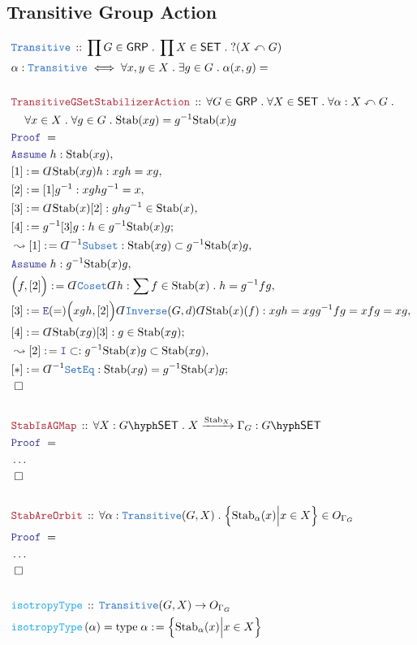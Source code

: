 \documentclass[12pt]{scrartcl}
\newcommand{\TYPE}[1]{\textcolor{NavyBlue}{\mathtt{#1}}}
\newcommand{\FUNC}[1]{\textcolor{Cerulean}{\mathtt{#1}}}
\newcommand{\LOGIC}[1]{\textcolor{Blue}{\mathtt{#1}}}
\newcommand{\THM}[1]{\textcolor{Maroon}{\mathtt{#1}}}
\renewcommand{\.}{\; . \;}
\newcommand{\de}{: \kern 0.1pc =}
\newcommand{\Act}[1]{\left( #1 \right)}
\newcommand{\Theorem}[2]{& \THM{#1} \, :: \, #2 \\ & \Proof = \\ }
\newcommand{\DeclareType}[2]{& \TYPE{#1} \, :: \, #2 \\}
\newcommand{\DefineType}[3]{& #1 : \TYPE{#2} \iff #3 \\}
\newcommand{\DeclareFunc}[2]{& \FUNC{#1} \, :: \, #2 \\}
\newcommand{\DefineNamedFunc}[4]{&  \FUNC{#1}\Act{#2} = #3 \de #4 \\}
\newcommand{\NewLine}{\\ & \kern 1pc}
\newcommand{\Page}[1]{ \begin{align*} #1 \end{align*}   }
\newcommand{ \bd }{ \ByDef }
\newcommand{\NoProof}{ & \ldots \\ \EndProof}
\newcommand{\Intro}{\LOGIC{I}}
\newcommand{\Elim}{\LOGIC{E}}
\newcommand{\Arrow}{\xrightarrow}
\newcommand{\Say}[3]{& #1 \de #2 : #3, \\}
\newcommand{\Conclude}[3]{& #1 \de #2 : #3; \\}
\newcommand{\Derive}[3]{& \leadsto #1 \de #2 : #3, \\}
\newcommand{\Assume}[2]{& \LOGIC{Assume} \; #1 : #2, \\}
\newcommand{\QED}{\; \square}
\newcommand{\EndProof}{& \QED \\}
\newcommand{\ByDef}{\rotatebox[origin=c]{-180}{$D$}}%
\newcommand{\Proof}{\LOGIC{Proof} \; }
\newcommand{\SET}{\mathsf{SET}}
\newcommand{\Stab}{\mathrm{Stab}}
\newcommand{\action}{\curvearrowleft}
\newcommand{\GRP}{\mathsf{GRP}}
\begin{document}
\subsection{Transitive Group Action}
\Page{
	\DeclareType{Transitive}{
		\prod G \in \GRP \. 
		\prod X \in \SET \.
		?(X \action G)
	}
	\DefineType{\alpha}{Transitive}{\forall x,y \in X \. \exists g \in G \. \alpha(x,g) = }
	\\
	\Theorem{TransitiveGSetStabilizerAction}
	{
		\forall G \in \GRP \.
		\forall X \in \SET \.
		\forall \alpha : X \action G \. \NewLine
		\forall x \in X \. 
		\forall g \in G \. 
		\Stab(xg) = g^{-1}\Stab(x)g 
	}
	\Assume{h}{\Stab(xg)}
	\Say{[1]}{\bd \Stab(xg) h}{xgh = xg}
	\Say{[2]}{[1]g^{-1}}{xghg^{-1} = x}
	\Say{[3]}{\bd \Stab(x)[2]}{ ghg^{-1} \in \Stab(x)}
	\Conclude{[4]}{g^{-1}[3] g}{h \in g^{-1}\Stab(x)g}
	\Derive{[1]}{\bd^{-1} \TYPE{Subset}}{\Stab(xg) \subset g^{-1}\Stab(x)g}
	\Assume{h}{g^{-1}\Stab(x)g}
	\Say{\Big( f,[2]\Big)}{\bd \TYPE{Coset}\bd h}
	{
		\sum f \in \Stab(x) \. h = g^{-1} f g
	}
	\Say{[3]}{ 
		\Elim(=)
		\Big(xgh,[2]\Big) 
		\bd \TYPE{Inverse}(G,d)    
		\bd \Stab(x)(f)
	}
	{
		xgh = 
		xgg^{-1} f g = 
		x f g =
		x g
	}
	\Conclude{[4]}{\bd \Stab(xg) [3]}
	{
		g \in \Stab(xg)
	}
	\Derive{[2]}{\Intro \subset}{g^{-1} \Stab(x) g \subset \Stab(xg)}
	\Conclude{[*]}{\bd^{-1} \TYPE{SetEq}}
	{
		\Stab(xg) = g^{-1} \Stab(x) g
	}
	\EndProof
	\\
	\Theorem{StabIsAGMap}
	{
		\forall X : G\hyph\SET \.
		X  \Arrow{\Stab_X}  \Gamma_G : G\hyph\SET  
	}
	\NoProof
	\\
	\Theorem{StabAreOrbit}
	{
		\forall \alpha : \TYPE{Transitive}(G,X) \.
		\Big\{ \Stab_\alpha(x) \Big| x \in X \Big\} \in O_{\Gamma_G}
	}
	\NoProof
	\\
	\DeclareFunc{isotropyType}{ \TYPE{Transitive}(G,X) \to O_{\Gamma_G} }
	\DefineNamedFunc{isotropyType}{\alpha}{\mathrm{type}\;\alpha}
	{
		\Big\{ \Stab_\alpha(x) \Big| x \in X \Big\}
	}
}
\end{document}

